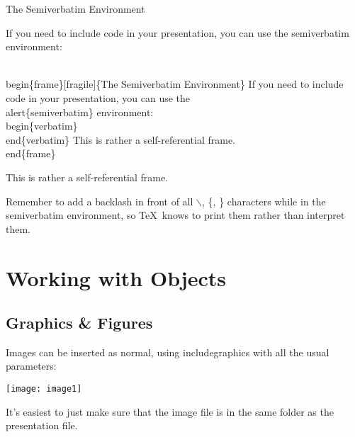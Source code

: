 \documentclass{beamer}
\begin{document}
\begin{frame}[fragile]{The Semiverbatim Environment}

	If you need to include code in your presentation, you can use the \alert{semiverbatim} environment:
	
	\begin{semiverbatim}
		\\begin\{frame\}[fragile]\{The Semiverbatim Environment\}			
		If you need to include code in your presentation, you can 	
		use the \\alert\{semiverbatim\} environment:
		\\begin\{verbatim\}
		\\end\{verbatim\}
			This is rather a self-referential frame.
		\\end\{frame\}
	\end{semiverbatim}
	
	This is rather a self-referential frame.
	
	\medskip
	
	Remember to add a backlash in front of all $\backslash$, \{, \} characters while in the \alert{semiverbatim} environment, so \TeX\ knows to print them rather than interpret them.

\end{frame}


\section{Working with Objects}
\subsection{Graphics \& Figures}


\begin{frame}								%

	Images can be inserted as normal, using \alert{includegraphics} with all the usual parameters:
	
	{\centering							%
	\texttt{[image: image1]}\par		%
	}									%
	
	It's easiest to just make sure that the image file is in the same folder as the presentation file.
	

\end{frame}
\end{document}
